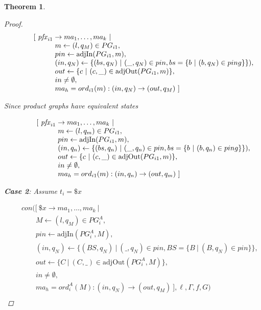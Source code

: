 \documentclass[twocolumn, openany]{sig-alternate-10pt}
\newtheorem{thm}{Theorem}
\begin{document}
\begin{thm}
\begin{proof}
  \[ \begin{array}{l}
     ~~~~~~~~~ [~ \mathit{pfx}_{i1} \rightarrow ma_1, \dots, ma_k ~\vert~ \\
     ~~~~~~~~~~~~~~~~~~ m \leftarrow (l,q_M) \in PG_{i1}, \\
     ~~~~~~~~~~~~~~~~~~ pin \leftarrow \text{adjIn}(PG_{i1},m), \\
     ~~~~~~~~~~~~~~~~~~ (in,q_N) \leftarrow \{ (bs,q_N) ~\vert~ (\_,q_N) \in pin, bs=\{ b ~\vert~ (b,q_N) \in ping \} \}), \\
     ~~~~~~~~~~~~~~~~~~ out \leftarrow \{ c ~\vert~ (c,\_) \in \text{adjOut}(PG_{i1},m) \}, \\
     ~~~~~~~~~~~~~~~~~~ in \neq \emptyset, \\
     ~~~~~~~~~~~~~~~~~~ ma_h = ord_{i1}(m) : (in,q_N) \rightarrow (out,q_M) ~] \\
  \end{array} \]%

  Since product graphs have equivalent states

  \[ \begin{array}{l}
     ~~~~~~~~~ [~ \mathit{pfx}_{i1} \rightarrow ma_1, \dots, ma_k ~\vert~ \\
     ~~~~~~~~~~~~~~~~~~ m \leftarrow (l,q_m) \in PG_{i1}, \\
     ~~~~~~~~~~~~~~~~~~ pin \leftarrow \text{adjIn}(PG_{i1},m), \\
     ~~~~~~~~~~~~~~~~~~ (in,q_n) \leftarrow \{ (bs,q_n) ~\vert~ (\_,q_n) \in pin, bs=\{ b ~\vert~ (b,q_n) \in ping \} \}), \\
     ~~~~~~~~~~~~~~~~~~ out \leftarrow \{ c ~\vert~ (c,\_) \in \text{adjOut}(PG_{i1},m) \}, \\
     ~~~~~~~~~~~~~~~~~~ in \neq \emptyset, \\
     ~~~~~~~~~~~~~~~~~~ ma_h = ord_{i1}(m) : (in,q_n) \rightarrow (out,q_m) ~] \\
  \end{array} \]%

  \vspace{1em}
  \textbf{Case 2}: Assume $t_i = \$x$

  \[ \begin{array}{l}
     ~~~~~~~~~ con([~ \$x \rightarrow ma_1, \dots, ma_k ~\vert~ \\
     ~~~~~~~~~~~~~~~~~~ M \leftarrow (l,q_M) \in PG^A_i, \\
     ~~~~~~~~~~~~~~~~~~ pin \leftarrow \text{adjIn}(PG^A_i,M), \\
     ~~~~~~~~~~~~~~~~~~ (in,q_N) \leftarrow \{ (BS,q_N) ~\vert~ (\_,q_N) \in pin, BS=\{B ~\vert~ (B,q_N) \in pin \} \}, \\
     ~~~~~~~~~~~~~~~~~~ out \leftarrow \{ C ~\vert~ (C,\_) \in \text{adjOut}(PG^A_i,M) \}, \\
     ~~~~~~~~~~~~~~~~~~ in \neq \emptyset, \\
     ~~~~~~~~~~~~~~~~~~ ma_h = ord^A_i(M) : (in,q_N) \rightarrow (out,q_M) ~],\ell,\Gamma,f,G) \\
  \end{array} \]%


\end{proof}
\end{thm}
\end{document}
